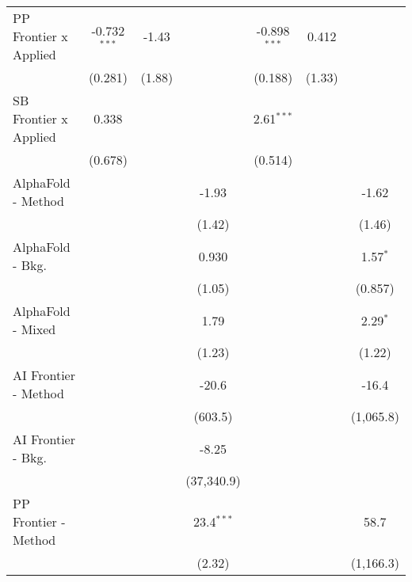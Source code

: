 \begin{tabular}{lcccccc}
   PP Frontier x Applied          & -0.732$^{***}$ & -1.43      &               & -0.898$^{***}$ & 0.412        &   \\   
                                  & (0.281)        & (1.88)     &               & (0.188)        & (1.33)       &   \\   
   SB Frontier x Applied          & 0.338          &            &               & 2.61$^{***}$   &              &   \\   
                                  & (0.678)        &            &               & (0.514)        &              &   \\   
   AlphaFold - Method             &                &            & -1.93         &                &              & -1.62\\   
                                  &                &            & (1.42)        &                &              & (1.46)\\   
   AlphaFold - Bkg.               &                &            & 0.930         &                &              & 1.57$^{*}$\\   
                                  &                &            & (1.05)        &                &              & (0.857)\\   
   AlphaFold - Mixed              &                &            & 1.79          &                &              & 2.29$^{*}$\\   
                                  &                &            & (1.23)        &                &              & (1.22)\\   
   AI Frontier - Method           &                &            & -20.6         &                &              & -16.4\\   
                                  &                &            & (603.5)       &                &              & (1,065.8)\\   
   AI Frontier - Bkg.             &                &            & -8.25         &                &              &   \\   
                                  &                &            & (37,340.9)    &                &              &   \\   
   PP Frontier - Method           &                &            & 23.4$^{***}$  &                &              & 58.7\\   
                                  &                &            & (2.32)        &                &              & (1,166.3)\\   

\end{tabular}
